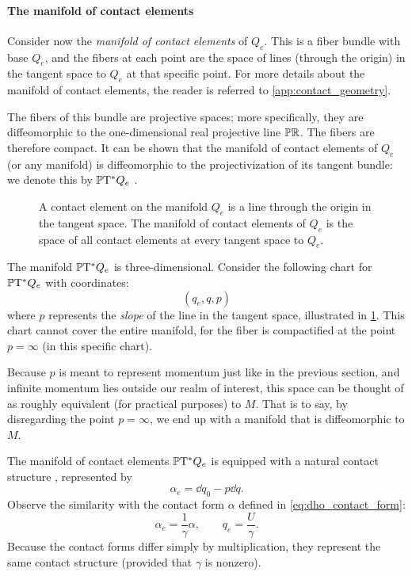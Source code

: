 \paragraph{The manifold of contact elements} Consider now the \emph{manifold of contact elements} of \(Q_e\). This is a fiber bundle with base \(Q_e\), and the fibers at each point are the space of lines (through the origin) in the tangent space to \(Q_e\) at that specific point. For more details about the manifold of contact elements, the reader is referred to \cref{app:contact_geometry}.

The fibers of this bundle are projective spaces; more specifically, they are diffeomorphic to the one-dimensional real projective line \(\mathbb{P}\mathbb{R}\). The fibers are therefore compact. It can be shown that the manifold of contact elements of \(Q_e\) (or any manifold) is diffeomorphic to the projectivization of its tangent bundle: we denote this by \(\mathbb{P}\mathrm{T}^* Q_e\) \cite{Cannas2001,Arnold1989,Libermann1987}.

\begin{figure}
    \centering
    
    \caption{A contact element on the manifold \(Q_e\) is a line through the origin in the tangent space. The manifold of contact elements of \(Q_e\) is the space of all contact elements at every tangent space to \(Q_e\).}
    \label{fig:manifold_contact_elements}
\end{figure}

The manifold \(\mathbb{P}\mathrm{T}^* Q_e\) is three-dimensional. Consider the following chart for \(\mathbb{P}\mathrm{T}^* Q_e\) with coordinates:
\begin{equation}
     (q_e, q, p)
\end{equation}
where \(p\) represents the \emph{slope} of the line in the tangent space, illustrated in \cref{fig:manifold_contact_elements}. This chart cannot cover the entire manifold, for the fiber is compactified at the point \(p = \infty\) (in this specific chart). 

Because \(p\) is meant to represent momentum just like in the previous section, and infinite momentum lies outside our realm of interest, this space can be thought of as roughly equivalent (for practical purposes) to \(M\). That is to say, by disregarding the point \(p = \infty\), we end up with a manifold that is diffeomorphic to \(M\).

The manifold of contact elements \(\mathbb{P}\mathrm{T}^* Q_e\) is equipped with a natural contact structure \cite{Arnold1989}, represented by
\begin{equation}
    \alpha_e = \dd{q}_0 - p\dd{q}.
\end{equation}
Observe the similarity with the contact form \(\alpha\) defined in \cref{eq:dho_contact_form}: 
\begin{equation}
     \alpha_e = \frac{1}{\gamma}\alpha, \qquad q_e = \frac{U}{\gamma}.
\end{equation}
Because the contact forms differ simply by multiplication, they represent the same contact structure (provided that \(\gamma\) is nonzero).

